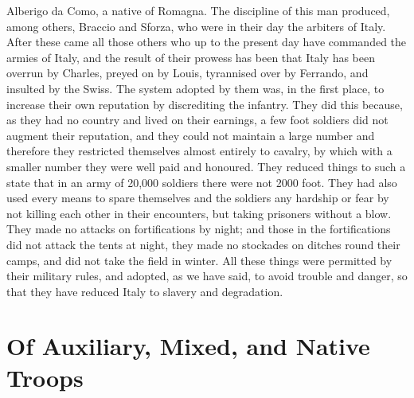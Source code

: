 \documentclass[12pt,letterpaper]{memoir}
\begin{document}
Alberigo da Como, a native of Romagna. The discipline of this man
produced, among others, Braccio and Sforza, who were in their day the
arbiters of Italy. After these came all those others who up to the
present day have commanded the armies of Italy, and the result of their
prowess has been that Italy has been overrun by Charles, preyed on by
Louis, tyrannised over by Ferrando, and insulted by the Swiss. The
system adopted by them was, in the first place, to increase their own
reputation by discrediting the infantry. They did this because, as they
had no country and lived on their earnings, a few foot soldiers did not
augment their reputation, and they could not maintain a large number
and therefore they restricted themselves almost entirely to cavalry,
by which with a smaller number they were well paid and honoured. They
reduced things to such a state that in an army of 20,000 soldiers there
were not 2000 foot. They had also used every means to spare themselves
and the soldiers any hardship or fear by not killing each other in
their encounters, but taking prisoners without a blow. They made no
attacks on fortifications by night; and those in the fortifications did
not attack the tents at night, they made no stockades on ditches round
their camps, and did not take the field in winter. All these things
were permitted by their military rules, and adopted, as we have said,
to avoid trouble and danger, so that they have reduced Italy to slavery
and degradation.

\chapter{Of Auxiliary, Mixed, and Native Troops}
\end{document}
